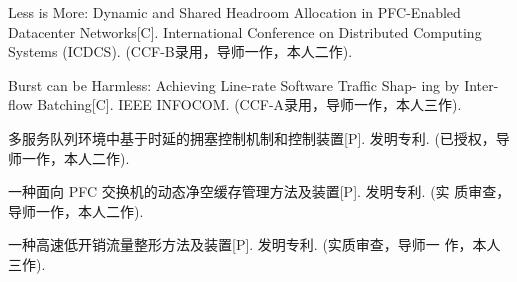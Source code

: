\begin{achievelist}
    \item Less is More: Dynamic and Shared Headroom Allocation in
    PFC-Enabled Datacenter Networks[C]. International Conference on Distributed Computing Systems (ICDCS). (CCF-B录用，导师一作，本人二作).
    \item Burst can be Harmless: Achieving Line-rate Software Traffic Shap-
    ing by Inter-flow Batching[C]. IEEE INFOCOM. (CCF-A录用，导师一作，本人三作).
    \item 多服务队列环境中基于时延的拥塞控制机制和控制装置[P]. 发明专利.
    (已授权，导师一作，本人二作).
    \item 一种面向 PFC 交换机的动态净空缓存管理方法及装置[P]. 发明专利. (实
    质审查，导师一作，本人二作).
    \item 一种高速低开销流量整形方法及装置[P]. 发明专利. (实质审查，导师一
    作，本人三作).
    
\end{achievelist}

\vspace{\baselineskip}
